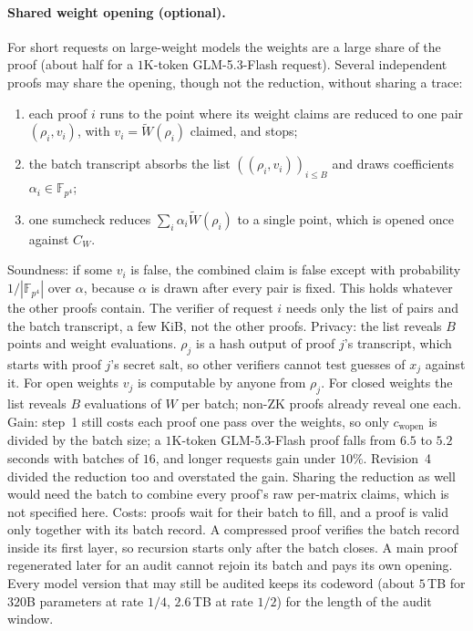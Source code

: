 \documentclass[11pt]{article}
\newcommand{\F}{\mathbb{F}}
\newcommand{\Fq}{\F_{p^4}}
\begin{document}
\paragraph{Shared weight opening (optional).}
For short requests on large-weight models the weights are a large share of the proof (about half for a \(1\)K-token GLM-5.3-Flash request).
Several independent proofs may share the opening, though not the reduction, without sharing a trace:
\begin{enumerate}
\item each proof \(i\) runs to the point where its weight claims are reduced to one pair \((\rho_i, v_i)\), with \(v_i = \tilde W(\rho_i)\) claimed, and stops;
\item the batch transcript absorbs the list \(((\rho_i, v_i))_{i \le B}\) and draws coefficients \(\alpha_i \in \Fq\);
\item one sumcheck reduces \(\sum_i \alpha_i \tilde W(\rho_i)\) to a single point, which is opened once against \(C_W\).
\end{enumerate}
Soundness: if some \(v_i\) is false, the combined claim is false except with probability \(1/|\Fq|\) over \(\alpha\), because \(\alpha\) is drawn after every pair is fixed.
This holds whatever the other proofs contain.
The verifier of request \(i\) needs only the list of pairs and the batch transcript, a few KiB, not the other proofs.
Privacy: the list reveals \(B\) points and weight evaluations.
\(\rho_j\) is a hash output of proof \(j\)'s transcript, which starts with proof \(j\)'s secret salt, so other verifiers cannot test guesses of \(x_j\) against it.
For open weights \(v_j\) is computable by anyone from \(\rho_j\).
For closed weights the list reveals \(B\) evaluations of \(W\) per batch; non-ZK proofs already reveal one each.
Gain: step~1 still costs each proof one pass over the weights, so only \(c_{\mathrm{wopen}}\) is divided by the batch size; a \(1\)K-token GLM-5.3-Flash proof falls from \(6.5\) to \(5.2\) seconds with batches of \(16\), and longer requests gain under \(10\%\).
Revision~4 divided the reduction too and overstated the gain.
Sharing the reduction as well would need the batch to combine every proof's raw per-matrix claims, which is not specified here.
Costs: proofs wait for their batch to fill, and a proof is valid only together with its batch record.
A compressed proof verifies the batch record inside its first layer, so recursion starts only after the batch closes.
A main proof regenerated later for an audit cannot rejoin its batch and pays its own opening.
Every model version that may still be audited keeps its codeword (about \(5\)\,TB for \(320\)B parameters at rate \(1/4\), \(2.6\)\,TB at rate \(1/2\)) for the length of the audit window.
\end{document}
